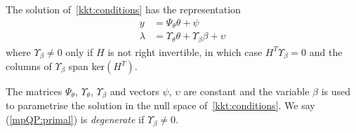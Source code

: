 \begin{thm}\label{lem:mpQP:solution}
The solution of~\eqref{kkt:conditions} has the representation
%
\begin{equation}\label{mpQP:solution}
	\begin{split}
		y &= \Psi_\theta \theta + \psi\\
		\lambda &= \Upsilon_\theta \theta + \Upsilon_\beta \beta + \upsilon
	\end{split}
\end{equation}
%
where $\Upsilon_\beta\neq 0$ only if $H$ is not right invertible, in which case $H^T\Upsilon_\beta=0$ and the columns of $\Upsilon_\beta$ span ker$(H^T)$.
\end{thm}
%
\noindent The matrices $\Psi_\theta$, $\Upsilon_\theta$, $\Upsilon_\beta$ and vectors $\psi$, $\upsilon$ are constant and the variable $\beta$ is used to parametrise the solution in the null space of~\eqref{kkt:conditions}. 
%
We say (\ref{mpQP:primal}) is \emph{degenerate} if $\Upsilon_\beta\neq 0$.
%
